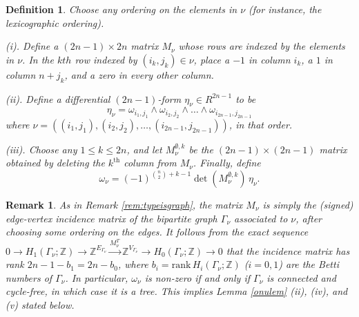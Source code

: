 \documentclass[10pt]{amsart}
\newcommand{\ZZ}{{\mathbb Z}}
\theoremstyle{plain}
\newtheorem{remark}[thm]{Remark}
\newtheorem{defn}[thm]{Definition}
\newcommand{\0}{\color{blue}{\mathsf{0}}}
\begin{document}
\begin{defn} \label{defn: omeganu}
Choose any ordering on the elements in $\nu$ (for instance, the lexicographic ordering). 


(i). Define a $(2n-1) \times 2n$ matrix  $M_{\nu}$ 
whose rows are indexed by the elements in $\nu$. In the $kth$ row indexed by $(i_k,j_k) \in \nu$, place a $-1$ in column $i_k$, a $1$ in column $n+j_k$, and a zero in every other column.


(ii). Define a differential $(2n-1)$-form $\eta_{\nu} \in R^{2n-1}$ to be 
\[ \eta_{\nu} = \omega_{i_1,j_1} \wedge \omega_{i_2,j_2} \wedge \ldots \wedge\omega_{i_{2n-1}, j_{2n-1}} \]
where $\nu = ((i_1,j_1), (i_2,j_2), \ldots ,  (i_{2n-1},j_{2n-1}) )$, in that order.


(iii). Choose any $1    \leq k \leq 2n$, and let  $M_{\nu}^{\emptyset,k}$ be the  $(2n-1) \times (2n-1)$  matrix obtained by deleting the $k^{\mathrm{th}}$ column from  $M_{\nu}$.  Finally, define
\begin{equation}  \label{omeganudefnANDepsilonk}
\omega_{\nu} = (-1)^{\binom{n}{2}+k-1}\det(M_{\nu}^{\emptyset,k})\, \eta_{\nu}.
\end{equation}
\end{defn}
\begin{remark} As in Remark \ref{rem:typeisgraph}, the matrix $M_{\nu}$ is simply the (signed) edge-vertex incidence matrix of the bipartite graph $\Gamma_{\nu}$ associated to $\nu$, after choosing some ordering on the edges.  It follows from the exact sequence
$0 \rightarrow H_1(\Gamma_{\nu};\ZZ) \rightarrow \ZZ^{E_{\Gamma_{\nu}}} \overset{M_{\nu}^T}{\rightarrow} \ZZ^{V_{\Gamma_{\nu}}} \rightarrow H_0(\Gamma_{\nu};\ZZ) \rightarrow 0$ that the incidence matrix has rank $2n-1-b_1=2n-b_0$, where $b_i = \mathrm{rank}\, H_i(\Gamma_{\nu};\ZZ)$ ($i=0,1$) are the Betti numbers of $\Gamma_{\nu}$.  In particular, $\omega_{\nu}$ is non-zero if and only if $\Gamma_{\nu}$ is connected and cycle-free, in which case it is a tree.
This implies Lemma \ref{onulem} (ii), (iv), and (v) stated below.
\end{remark}
    
\end{document}
